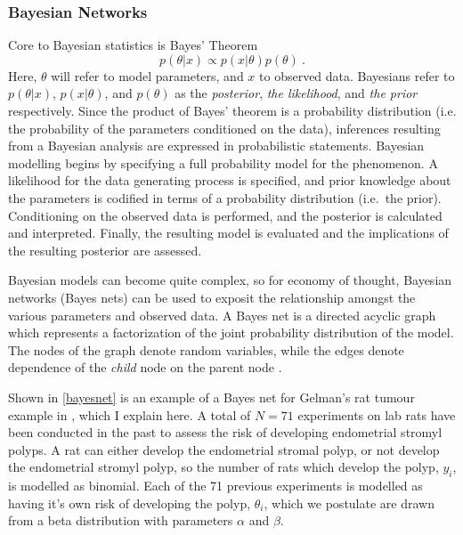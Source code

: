 \subsubsection{Bayesian Networks}

Core to Bayesian statistics is Bayes' Theorem
%
\begin{equation}\label{Bayes}
	p( \theta \vert x) \propto p(x \vert \theta) p(\theta) \>.
\end{equation}
%
Here, $ \theta $ will refer to model parameters, and $ x $ to observed data.  Bayesians refer to $ p( \theta \vert x) $, $ p(x \vert \theta) $, and $p(\theta)$ as the \textit{posterior}, \textit{the likelihood}, and \textit{the prior} respectively.  Since the product of Bayes' theorem is a probability distribution (i.e. the probability of the parameters conditioned on the data), inferences resulting from a Bayesian analysis are expressed in probabilistic statements. Bayesian modelling begins by specifying a full probability model for the phenomenon.  A likelihood for the data generating process is specified, and prior knowledge about the parameters is codified in terms of a probability distribution (i.e.\ the prior).  Conditioning on the observed data is performed, and the posterior is calculated and interpreted.  Finally, the resulting model is evaluated and the implications of the resulting posterior are assessed.

Bayesian models can become quite complex, so for economy of thought, Bayesian networks (Bayes nets) can be used to exposit the relationship amongst the various parameters and observed data.  A Bayes net is a directed acyclic graph which represents a factorization of the joint probability distribution of the model. The nodes of the graph denote random variables, while the edges denote dependence of the \textit{child} node on the parent node \cite{Bishop2006pattern}. 

Shown in \cref{bayesnet} is an example of a Bayes net for Gelman's rat tumour example in \cite{gelman2013bayesian}, which I explain here.  A total of $ N = 71 $ experiments on lab rats have been conducted in the past to assess the risk of developing endometrial stromyl polyps.  A rat can either develop the endometrial stromal polyp, or not develop the endometrial stromyl polyp, so the number of rats which develop the polyp, $ y_i $, is modelled as binomial.  Each of the 71 previous experiments is modelled as having it's own risk of developing the polyp, $ \theta_i $, which we postulate are drawn from a beta distribution with parameters $ \alpha $ and $ \beta $.  

